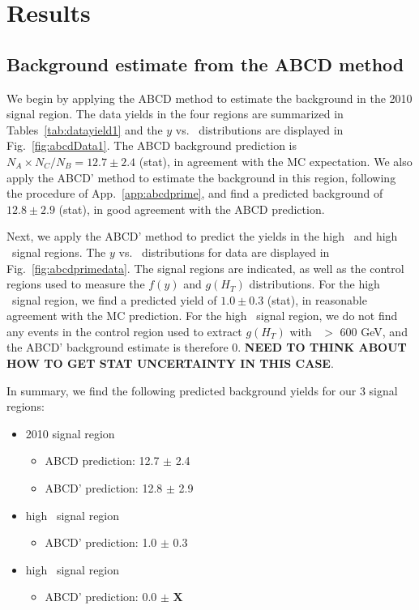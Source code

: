 \section{Results}
\label{sec:results}

\subsection{Background estimate from the ABCD method}
\label{sec:abcdres}

We begin by applying the ABCD method to estimate the background in the 2010 signal region.
The data yields in the four regions are summarized in Tables~\ref{tab:datayield1} and
the $y$ vs. \Ht\ distributions are displayed in Fig.~\ref{fig:abcdData1}.
The ABCD background prediction is $N_A \times N_C / N_B = 12.7 \pm 2.4$ (stat), in
agreement with the MC expectation. We also apply the ABCD' method to estimate the
background in this region, following the procedure of App.~\ref{app:abcdprime},
and find a predicted background of $12.8 \pm 2.9$ (stat), in good agreement
with the ABCD prediction.

Next, we apply the ABCD' method to predict the yields in the high \met\ and high \Ht\
signal regions. The $y$ vs. \Ht\ distributions for data are displayed in 
Fig.~\ref{fig:abcdprimedata}. The signal regions are indicated, as well as the control 
regions used to measure the $f(y)$ and $g(H_T)$ distributions. For the high \met\
signal region, we find a predicted yield of $1.0 \pm 0.3$ (stat), in reasonable
agreement with the MC prediction. For the high \Ht\ signal region, we do not find
any events in the control region used to extract $g(H_T)$ with \Ht\ $>$ 600 GeV,
and the ABCD' background estimate is therefore 0.
{\bf NEED TO THINK ABOUT HOW TO GET STAT UNCERTAINTY IN THIS CASE}.

In summary, we find the following predicted background yields for our 3 signal regions:

\begin{itemize}
\item 2010 signal region
\begin{itemize}
\item ABCD prediction:  12.7 $\pm$ 2.4
\item ABCD' prediction: 12.8 $\pm$ 2.9
\end{itemize}
\item high \met\ signal region
\begin{itemize}
\item ABCD' prediction: 1.0 $\pm$ 0.3
\end{itemize}
\item high \Ht\ signal region
\begin{itemize}
\item ABCD' prediction: 0.0 $\pm$ {\bf X}
\end{itemize}
\end{itemize}


